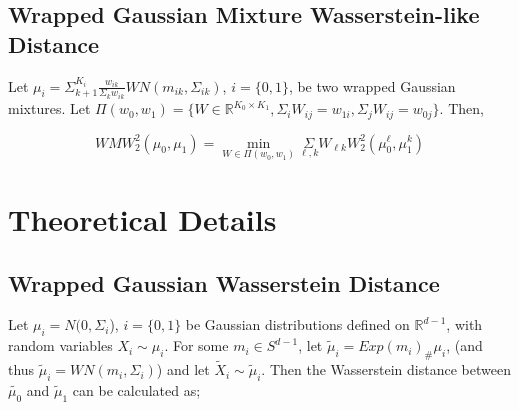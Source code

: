 \documentclass[]{article}
\begin{document}
\subsection{Wrapped Gaussian Mixture Wasserstein-like Distance}

Let $\mu_i = \Sigma_{k+1}^{K_i} \frac{w_{ik}}{\Sigma_k w_{ik}}WN(m_{ik},\Sigma_{ik})$, $i = \{0, 1\}$, be two wrapped Gaussian mixtures. Let $\Pi(w_0, w_1) = \{ W \in \mathbb{R}^{K_0 \times K_1}, \Sigma_i W_{ij} = w_{1i},\Sigma_j W_{ij} = w_{0j}\}$. Then,

%
%

\begin{equation*}
	WMW_2^2(\mu_0,\mu_1) = \underset{W \in \Pi(w_0,w_1)}{\min}  \underset{{\ell, k}}{\Sigma} W_{\ell k} W_2^2(\mu_0^\ell,\mu_1^k)
\end{equation*} 


\newpage

\section{Theoretical Details}\label{Section: theory}

%
%



\subsection{Wrapped Gaussian Wasserstein Distance}

Let $\mu_i = N(0,\Sigma_i$), $i = \{0,1\}$ be Gaussian distributions defined on $\mathbb{R}^{d-1}$, with random variables $X_i \sim \mu_i$. For some $m_i \in S^{d-1}$, let $\tilde{\mu}_i = Exp(m_i)_\#\mu_i$, (and thus $\tilde{\mu}_i = WN(m_i, \Sigma_i)$)   and let $\tilde{X}_i \sim \tilde{\mu}_i$. Then the Wasserstein distance between $\tilde{\mu_0}$ and $\tilde{\mu}_1$ can be calculated as;\\
\end{document}
